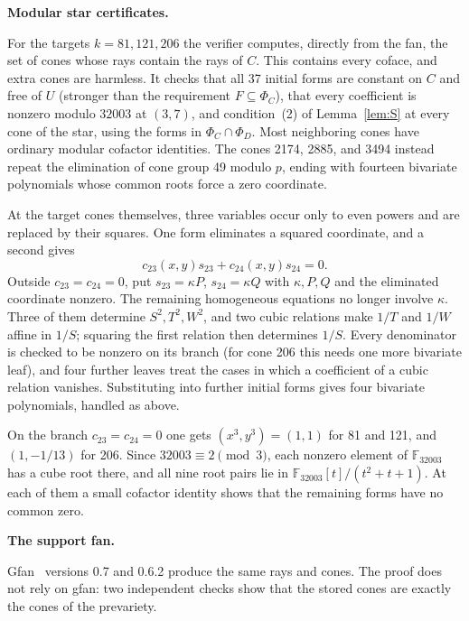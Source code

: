 \documentclass[11pt]{amsart}
\newcommand{\topic}[1]{\par\addvspace{1.4ex}\noindent\textbf{#1}\par\nobreak\smallskip\noindent}
\theoremstyle{definition}\newtheorem{definition}[theorem]{Definition}\theoremstyle{remark}\newtheorem{remark}[theorem]{Remark}
\begin{document}
\topic{Modular star certificates.} For the targets $k=81,121,206$ the verifier computes, directly from the fan, the set of cones whose rays contain the rays of $C$. This contains every coface, and extra cones are harmless. It checks that all 37 initial forms are constant on $C$ and free of $U$ (stronger than the requirement $F\subseteq\Phi_C$), that every coefficient is nonzero modulo $32003$ at $(3,7)$, and condition~(2) of Lemma~\ref{lem:S} at every cone of the star, using the forms in $\Phi_C\cap\Phi_D$. Most neighboring cones have ordinary modular cofactor identities. The cones 2174, 2885, and 3494 instead repeat the elimination of cone group 49 modulo $p$, ending with fourteen bivariate polynomials whose common roots force a zero coordinate.

At the target cones themselves, three variables occur only to even powers and are replaced by their squares. One form eliminates a squared coordinate, and a second gives
\[
 c_{23}(x,y)s_{23}+c_{24}(x,y)s_{24}=0.
\]
Outside $c_{23}=c_{24}=0$, put $s_{23}=\kappa P$, $s_{24}=\kappa Q$ with $\kappa,P,Q$ and the eliminated coordinate nonzero. The remaining homogeneous equations no longer involve $\kappa$. Three of them determine $S^2,T^2,W^2$, and two cubic relations make $1/T$ and $1/W$ affine in $1/S$; squaring the first relation then determines $1/S$. Every denominator is checked to be nonzero on its branch (for cone 206 this needs one more bivariate leaf), and four further leaves treat the cases in which a coefficient of a cubic relation vanishes. Substituting into further initial forms gives four bivariate polynomials, handled as above.

On the branch $c_{23}=c_{24}=0$ one gets $(x^3,y^3)=(1,1)$ for 81 and 121, and $(1,-1/13)$ for 206. Since $32003\equiv2\pmod3$, each nonzero element of $\mathbb F_{32003}$ has a cube root there, and all nine root pairs lie in $\mathbb F_{32003}[t]/(t^2+t+1)$. At each of them a small cofactor identity shows that the remaining forms have no common zero.

\topic{The support fan.} Gfan~\citep{gfan} versions 0.7 and 0.6.2 produce the same rays and cones. The proof does not rely on gfan: two independent checks show that the stored cones are exactly the cones of the prevariety.
\end{document}

